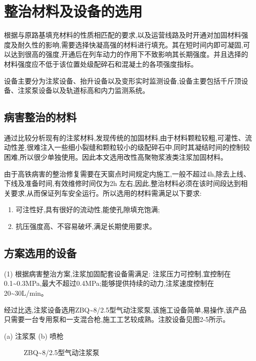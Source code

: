 \documentclass[a4paper,12pt]{ctexrep}
\begin{document}
\section{整治材料及设备的选用}

根据与原路基填充材料的性质相匹配的要求,以及运营线路及时开通对加固材料强度及耐久性的影响,需要选择快凝高强的材料进行填充。其在短时间内即可凝固,可以达到很高的强度,开通后在列车动力的作用下不致影响其长期强度。并且选择的材料强度应不低于该位置处级配碎石和混凝土的各项强度指标。

设备主要分为注浆设备、抬升设备以及变形实时监测设备,设备主要包括千斤顶设备、注浆泵设备以及轨道标高和内力监测系统。

\subsection{病害整治的材料}

通过比较分析现有的注浆材料,发现传统的加固材料,由于材料颗粒较粗,可灌性、流动性差,很难注入一些细小裂缝和颗粒较小的级配碎石中,同时其凝结时间的控制较困难,所以很少单独使用。因此本文选用改性高聚物浆液类注浆加固材料。

由于高铁病害的整治修复需要在天窗点时间规定内施工,一般不超过4h,除去上线、下线及准备时间,有效维修时间仅为2h 左右,因此,整治材料必须在该时间段达到相关要求,从而保证列车安全运行。所以选用的材料需满足以下要求:
\begin{enumerate}
    \item 可注性好,具有很好的流动性,能使孔隙填充饱满;
    \item 抗压强度高、不容易破坏,满足长期使用要求。
\end{enumerate}

\subsection{方案选用的设备}

(1) 根据病害整治方案,注浆加固配套设备需满足: 注浆压力可控制,宜控制在0.1\textasciitilde0.3MPa,最大不超过0.4MPa;能够提供持续的动力,注浆速度控制在20\textasciitilde30L/min。

经过比选,注浆设备选用ZBQ\textasciitilde8/2.5型气动注浆泵,该施工设备简单,易操作,该产品只需要一台专用泵和一支混合枪,施工工艺较成熟。注胶设备见图2-5所示。

(a) 注浆泵
(b) 喷枪

\begin{figure}[htbp]
    \centering
    \caption{ZBQ\textasciitilde8/2.5型气动注浆泵}
    \label{fig:2-5}
\end{figure}
\end{document}
